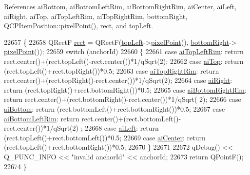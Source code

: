 References ai\+Bottom, ai\+Bottom\+Left\+Rim, ai\+Bottom\+Right\+Rim, ai\+Center, ai\+Left, ai\+Right, ai\+Top, ai\+Top\+Left\+Rim, ai\+Top\+Right\+Rim, bottom\+Right, Q\+C\+P\+Item\+Position\+::pixel\+Point(), rect, and top\+Left.


\begin{DoxyCode}
22657 \{
22658   QRectF \hyperlink{_gen_blob_8m_aea8f6815d9a63491fc422c5572c6b3c3}{rect} = QRectF(\hyperlink{class_q_c_p_item_ellipse_a12fd8420c06718d0c8a2303d6a652848}{topLeft}->\hyperlink{class_q_c_p_item_position_ae490f9c76ee2ba33752c495d3b6e8fb5}{pixelPoint}(), \hyperlink{class_q_c_p_item_ellipse_ab73c8deafc0d8d1ef7d75b6cdcc37159}{bottomRight}->
      \hyperlink{class_q_c_p_item_position_ae490f9c76ee2ba33752c495d3b6e8fb5}{pixelPoint}());
22659   \textcolor{keywordflow}{switch} (anchorId)
22660   \{
22661     \textcolor{keywordflow}{case} \hyperlink{class_q_c_p_item_ellipse_a415009889543169f35b70795f415e45eab2538849b88921e7fc1dcc15b2a6109d}{aiTopLeftRim}:     \textcolor{keywordflow}{return} rect.center()+(rect.topLeft()-rect.center())*1/qSqrt(2);
22662     \textcolor{keywordflow}{case} \hyperlink{class_q_c_p_item_ellipse_a415009889543169f35b70795f415e45ea83e55b0c1799baac1eecab52bcbe096d}{aiTop}:            \textcolor{keywordflow}{return} (rect.topLeft()+rect.topRight())*0.5;
22663     \textcolor{keywordflow}{case} \hyperlink{class_q_c_p_item_ellipse_a415009889543169f35b70795f415e45ea415d82233c14f0c70c245d50e706e75b}{aiTopRightRim}:    \textcolor{keywordflow}{return} rect.center()+(rect.topRight()-rect.center())*1/qSqrt(2);
22664     \textcolor{keywordflow}{case} \hyperlink{class_q_c_p_item_ellipse_a415009889543169f35b70795f415e45ea0f0dcfdf87d9405b53b2129740fb6ba6}{aiRight}:          \textcolor{keywordflow}{return} (rect.topRight()+rect.bottomRight())*0.5;
22665     \textcolor{keywordflow}{case} \hyperlink{class_q_c_p_item_ellipse_a415009889543169f35b70795f415e45eab62732e96d67801d50c6a9bdebc374d0}{aiBottomRightRim}: \textcolor{keywordflow}{return} rect.center()+(rect.bottomRight()-rect.center())*1/qSqrt(
      2);
22666     \textcolor{keywordflow}{case} \hyperlink{class_q_c_p_item_ellipse_a415009889543169f35b70795f415e45ea5894287dedaeec1f48394fd950ccff5b}{aiBottom}:         \textcolor{keywordflow}{return} (rect.bottomLeft()+rect.bottomRight())*0.5;
22667     \textcolor{keywordflow}{case} \hyperlink{class_q_c_p_item_ellipse_a415009889543169f35b70795f415e45ea7b8101bfc590af8ce32961f6545c4f90}{aiBottomLeftRim}:  \textcolor{keywordflow}{return} rect.center()+(rect.bottomLeft()-rect.center())*1/qSqrt(2)
      ;
22668     \textcolor{keywordflow}{case} \hyperlink{class_q_c_p_item_ellipse_a415009889543169f35b70795f415e45eae74dad00419a0e1f42877510158fb922}{aiLeft}:           \textcolor{keywordflow}{return} (rect.topLeft()+rect.bottomLeft())*0.5;
22669     \textcolor{keywordflow}{case} \hyperlink{class_q_c_p_item_ellipse_a415009889543169f35b70795f415e45ea580ec0e9b9fd1488fccf5783e52c0c02}{aiCenter}:         \textcolor{keywordflow}{return} (rect.topLeft()+rect.bottomRight())*0.5;
22670   \}
22671   
22672   qDebug() << Q\_FUNC\_INFO << \textcolor{stringliteral}{"invalid anchorId"} << anchorId;
22673   \textcolor{keywordflow}{return} QPointF();
22674 \}
\end{DoxyCode}



